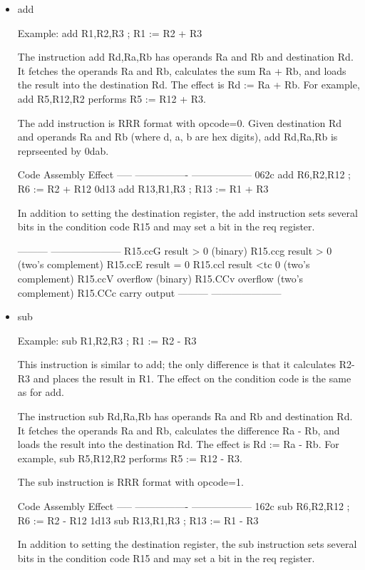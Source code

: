 \documentclass[11pt]{article}
\begin{document}
\begin{itemize}
\item add
\label{sec:org590a78b}

Example: add R1,R2,R3 ; R1 := R2 + R3

The instruction add Rd,Ra,Rb has operands Ra and Rb and destination
Rd.  It fetches the operands Ra and Rb, calculates the sum Ra + Rb,
and loads the result into the destination Rd.  The effect is Rd :=
Ra + Rb.  For example, add R5,R12,R2 performs R5 := R12 + R3.

The add instruction is RRR format with opcode=0.  Given destination Rd
and operands Ra and Rb (where d, a, b are hex digits), add Rd,Ra,Rb is
reprseented by 0dab.

Code    Assembly          Effect
-----   ----------------  ------------------
062c    add R6,R2,R12     ; R6 := R2 + R12
0d13    add R13,R1,R3     ; R13 := R1 + R3

In addition to setting the destination register, the add instruction
sets several bits in the condition code R15 and may set a bit in the
req register.

---------  ---------------------
 R15.ccG    result > 0 (binary)
 R15.ccg    result > 0 (two's complement)
 R15.ccE    result = 0
 R15.ccl    result <tc 0 (two's complement)
 R15.ccV    overflow (binary)
 R15.CCv    overflow (two's complement)
 R15.CCc    carry output
---------  ---------------------

\item sub
\label{sec:org36ccf6d}

Example: sub R1,R2,R3 ; R1 := R2 - R3

This instruction is similar to add; the only difference is that it
calculates R2-R3 and places the result in R1.  The effect on the
condition code is the same as for add.

The instruction sub Rd,Ra,Rb has operands Ra and Rb and destination
Rd.  It fetches the operands Ra and Rb, calculates the difference Ra -
Rb, and loads the result into the destination Rd.  The effect is Rd :=
Ra - Rb.  For example, sub R5,R12,R2 performs R5 := R12 - R3.

The sub instruction is RRR format with opcode=1.

Code    Assembly          Effect
-----   ----------------  ------------------
162c    sub R6,R2,R12     ; R6 := R2 - R12
1d13    sub R13,R1,R3     ; R13 := R1 - R3

In addition to setting the destination register, the sub instruction
sets several bits in the condition code R15 and may set a bit in the
req register.


\end{itemize}
\end{document}
